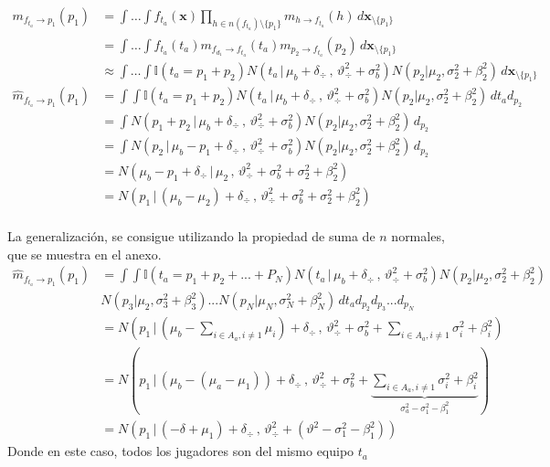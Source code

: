 \documentclass[11pt,twoside,spanish]{report} %
\begin{document}
\begin{equation}\label{eq:^m_fta_p}
	\begin{split}
		m_{f_{t_a} \rightarrow p_1}(p_1) &= \int \dots \int f_{t_a}(\textbf{x}) \prod_{h \in n(f_{t_a}) \setminus \{p_1\} } m_{h \rightarrow f_{t_a}}(h) \, d\textbf{x}_{\setminus \{p_1\} }  \\
		&= \int \dots \int f_{t_a}(t_a)  m_{f_{d_1} \rightarrow f_{t_a}}(t_a) m_{p_2 \rightarrow f_{t_a}}(p_2)\, d\textbf{x}_{\setminus \{p_1\} }  \\
		&\approx  \int \dots \int \mathbb{I}(t_a = p_1 + p_2) N(t_a \, | \, \mu_b + \delta_{\div} \, , \, \vartheta_{\div}^2 + \sigma_b^2) N(p_2 | \mu_2 , \sigma_2^2 + \beta_2^2)  \, d\textbf{x}_{\setminus \{p_1\} } \\[0.1cm]
		\widehat{m}_{f_{t_a} \rightarrow p_1}(p_1)  & =\int \int \mathbb{I}(t_a = p_1 + p_2) N(t_a \, | \, \mu_b + \delta_{\div} \, , \, \vartheta_{\div}^2 + \sigma_b^2) N(p_2 | \mu_2 , \sigma_2^2 + \beta_2^2)  \, d{t_a} d_{p_2} \\
		& =\int N(p_1 + p_2 \, | \, \mu_b + \delta_{\div} \, , \, \vartheta_{\div}^2 + \sigma_b^2) N(p_2 | \mu_2 , \sigma_2^2+ \beta_2^2 )   \, d_{p_2} \\
		& =\int N(p_2 \, | \, \mu_b - p_1 + \delta_{\div} \, , \, \vartheta_{\div}^2 + \sigma_b^2) N(p_2 | \mu_2 , \sigma_2^2 + \beta_2^2)   \, d_{p_2} \\
		& = N(\mu_b - p_1 + \delta_{\div} \,|\, \mu_2 \,,\,\vartheta_{\div}^2 + \sigma_b^2 + \sigma_2^2 + \beta_2^2)   \\
		&=  N( p_1 \,|\,  (\mu_b - \mu_2) + \delta_{\div}  \,,\,\vartheta_{\div}^2 + \sigma_b^2 + \sigma_2^2 + \beta_2^2)  \\
	\end{split}
\end{equation}


La generalizaci\'on, se consigue utilizando la propiedad de suma de $n$ normales, que se muestra en el anexo.
\begin{equation}
	\begin{split}
		\widehat{m}_{f_{t_a} \rightarrow p_1}(p_1) &=\int \int \mathbb{I}(t_a = p_1 + p_2 + ...+ P_N) N(t_a \, | \, \mu_b + \delta_{\div} \, , \, \vartheta_{\div}^2 + \sigma_b^2) N(p_2 | \mu_2 , \sigma_2^2 + \beta_2^2)\\ &N(p_3 | \mu_2 , \sigma_3^2 + \beta_3^2)... N(p_N | \mu_N , \sigma_N^2 + \beta_N^2)  \, d{t_a} d_{p_2}d_{p_3}...d_{p_N} \\
		&= N( p_1 \,|\, (\mu_b  - \sum_{i \in A_a, i\neq1} \mu_i) + \delta_{\div}  \,,\,\vartheta_{\div}^2 + \sigma_b^2 + \sum_{i \in A_a, i\neq1} \sigma_i^2 + \beta_i^2 ) \\
		&= N( p_1 \,|\, (\mu_b  -(\mu_a-\mu_1)) + \delta_{\div}  \,,\,\vartheta_{\div}^2 + \sigma_b^2 + \underbrace{\sum_{i \in A_a, i\neq1} \sigma_i^2 + \beta_i^2}_{\sigma_a^2-\sigma_1^2 - \beta_1^2} ) \\
		& = N( p_1 \,|\, (-\delta + \mu_1) + \delta_{\div}  \,,\,\vartheta_{\div}^2 + (\vartheta^2 - \sigma_1^2 - \beta_1^2))
	\end{split}
\end{equation}
Donde en este caso, todos los jugadores son del mismo equipo $t_a$
\end{document}
